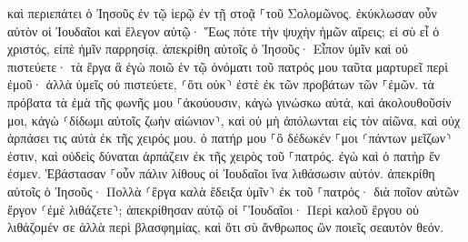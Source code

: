 \documentclass{openreader}
\begin{document}
καὶ περιεπάτει ὁ Ἰησοῦς ἐν τῷ ἱερῷ ἐν τῇ στοᾷ ⸀τοῦ Σολομῶνος. 
ἐκύκλωσαν οὖν αὐτὸν οἱ Ἰουδαῖοι καὶ ἔλεγον αὐτῷ· Ἕως πότε τὴν ψυχὴν ἡμῶν αἴρεις; εἰ σὺ εἶ ὁ χριστός, εἰπὲ ἡμῖν παρρησίᾳ. 
ἀπεκρίθη αὐτοῖς ὁ Ἰησοῦς· Εἶπον ὑμῖν καὶ οὐ πιστεύετε· τὰ ἔργα ἃ ἐγὼ ποιῶ ἐν τῷ ὀνόματι τοῦ πατρός μου ταῦτα μαρτυρεῖ περὶ ἐμοῦ· 
ἀλλὰ ὑμεῖς οὐ πιστεύετε, ⸂ὅτι οὐκ⸃ ἐστὲ ἐκ τῶν προβάτων τῶν ⸀ἐμῶν. 
τὰ πρόβατα τὰ ἐμὰ τῆς φωνῆς μου ⸀ἀκούουσιν, κἀγὼ γινώσκω αὐτά, καὶ ἀκολουθοῦσίν μοι, 
κἀγὼ ⸂δίδωμι αὐτοῖς ζωὴν αἰώνιον⸃, καὶ οὐ μὴ ἀπόλωνται εἰς τὸν αἰῶνα, καὶ οὐχ ἁρπάσει τις αὐτὰ ἐκ τῆς χειρός μου. 
ὁ πατήρ μου ⸀ὃ δέδωκέν ⸀μοι ⸂πάντων μεῖζων⸃ ἐστιν, καὶ οὐδεὶς δύναται ἁρπάζειν ἐκ τῆς χειρὸς τοῦ ⸀πατρός. 
ἐγὼ καὶ ὁ πατὴρ ἕν ἐσμεν. 
Ἐβάστασαν ⸀οὖν πάλιν λίθους οἱ Ἰουδαῖοι ἵνα λιθάσωσιν αὐτόν. 
ἀπεκρίθη αὐτοῖς ὁ Ἰησοῦς· Πολλὰ ⸂ἔργα καλὰ ἔδειξα ὑμῖν⸃ ἐκ τοῦ ⸀πατρός· διὰ ποῖον αὐτῶν ἔργον ⸂ἐμὲ λιθάζετε⸃; 
ἀπεκρίθησαν αὐτῷ οἱ ⸀Ἰουδαῖοι· Περὶ καλοῦ ἔργου οὐ λιθάζομέν σε ἀλλὰ περὶ βλασφημίας, καὶ ὅτι σὺ ἄνθρωπος ὢν ποιεῖς σεαυτὸν θεόν. 
\end{document}
